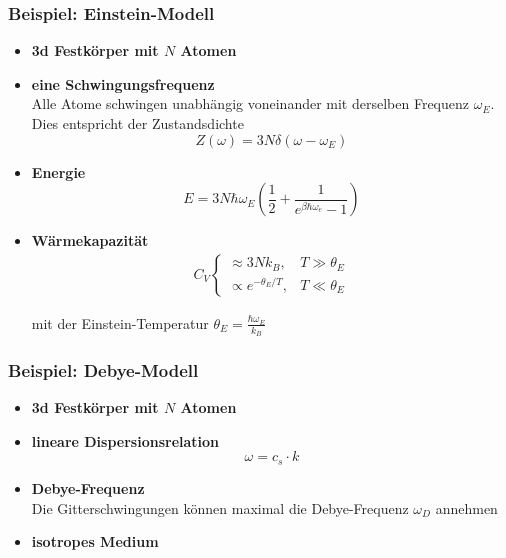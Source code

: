 \documentclass{article}
\newcommand{\lr}[1]{\left(#1\right)}
\begin{document}
\newpage


\subsubsection{Beispiel: Einstein-Modell}
	\begin{itemize}
		\item \textbf{3d Festkörper mit $N$ Atomen}
		
		
		\item \textbf{eine Schwingungsfrequenz}\\
		Alle Atome schwingen unabhängig voneinander mit derselben Frequenz $\omega_E$. Dies entspricht der Zustandsdichte
			\begin{equation}
				Z(\omega) = 3N\delta(\omega - \omega_E)
			\end{equation}
	\end{itemize}


	\begin{itemize}
		\item \textbf{Energie}
			\begin{equation}
				E = 3N \hbar \omega_E \lr{ \frac{1}{2} + \frac{1}{e^{\beta \hbar \omega_e} - 1} }
			\end{equation}
		
		\item \textbf{Wärmekapazität}
			\begin{align}
				C_V
				\begin{cases}
					\approx 3N k_B, & T \gg \theta_E \\
					\propto e^{-\theta_E/T}, & T \ll \theta_E
				\end{cases}
			\end{align}
		
		mit der Einstein-Temperatur $\theta_E = \frac{\hbar\omega_E}{k_B}$
	\end{itemize}


\newpage


\subsubsection{Beispiel: Debye-Modell}
	\begin{itemize}
		\item \textbf{3d Festkörper mit $N$ Atomen}
		
		
		\item \textbf{lineare Dispersionsrelation}
			\begin{equation}
				\omega = c_s \cdot k
			\end{equation}
		
		
		\item \textbf{Debye-Frequenz}\\
		Die Gitterschwingungen können maximal die Debye-Frequenz $\omega_D$ annehmen
		
		
		\item \textbf{isotropes Medium}
	\end{itemize}
\end{document}
